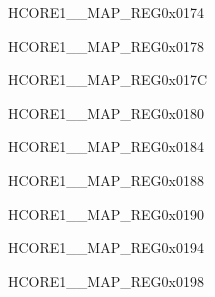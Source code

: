 \begin{register}{H}{CORE1\_\_MAP\_REG}{0x0174}\label{regdesc:CORE1USBOTGINTMAPREG}
\end{register}\vspace{-3em}


\begin{register}{H}{CORE1\_\_MAP\_REG}{0x0178}\label{regdesc:CORE1USBOTGENDPMULTIPROCINTMAPREG}
\end{register}\vspace{-3em}


\begin{register}{H}{CORE1\_\_MAP\_REG}{0x017C}\label{regdesc:CORE1JPEGINTMAPREG}
\end{register}\vspace{-3em}


\begin{register}{H}{CORE1\_\_MAP\_REG}{0x0180}\label{regdesc:CORE1PPAINTMAPREG}
\end{register}\vspace{-3em}


\begin{register}{H}{CORE1\_\_MAP\_REG}{0x0184}\label{regdesc:CORE1CORE0TRACEINTMAPREG}
\end{register}\vspace{-3em}


\begin{register}{H}{CORE1\_\_MAP\_REG}{0x0188}\label{regdesc:CORE1CORE1TRACEINTMAPREG}
\end{register}\vspace{-3em}



\begin{register}{H}{CORE1\_\_MAP\_REG}{0x0190}\label{regdesc:CORE1ISPINTMAPREG}
\end{register}\vspace{-3em}


\begin{register}{H}{CORE1\_\_MAP\_REG}{0x0194}\label{regdesc:CORE1I3CMSTINTMAPREG}
\end{register}\vspace{-3em}


\begin{register}{H}{CORE1\_\_MAP\_REG}{0x0198}\label{regdesc:CORE1I3CSLVINTMAPREG}
\end{register}\vspace{-3em}


